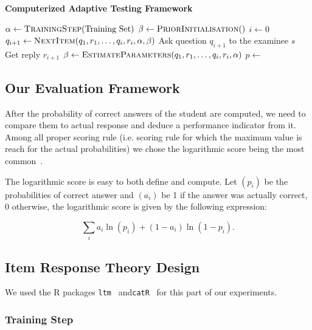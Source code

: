 \documentclass{sig-alternate}
\begin{document}
\begin{algorithm}
\caption*{\textbf{Computerized Adaptive Testing Framework}}
\begin{algorithmic}
\State $\alpha \gets \Call{TrainingStep}{\text{Training Set}}$
\State $\beta \gets \Call{PriorInitialisation}$
\State $i \gets 0$
		\State $q_{i + 1} \gets \Call{NextItem}{q_1, r_1, \ldots, q_i, r_i, \alpha, \beta}$
		\State Ask question $q_{i + 1}$ to the examinee $s$
		\State Get reply $r_{i + 1}$
		\State $\beta \gets \Call{EstimateParameters}{q_1, r_1, \ldots, q_i, r_i, \alpha}$
	\EndWhile
	\State $p \gets$ 
	\State {}
\EndFor
\EndProcedure
\end{algorithmic}
\end{algorithm}

\subsection{Our Evaluation Framework}

After the probability of correct answers of the student are computed, we need to compare them to actual response and deduce a performance indicator from it. Among all proper scoring rule (i.e. scoring rule for which the maximum value is reach for the actual probabilities) we chose the logarithmic score being the most common~\citep{Gneiting2007}.

The logarithmic score is easy to both define and compute. Let $(p_i)$ be the probabilities of correct answer and $(a_i)$ be 1 if the answer was actually correct, 0 otherwise, the logarithmic score is given by the following expression: 

\[ \sum_i a_i\ln(p_i) + (1-a_i)\ln(1-p_i).\]

\subsection{Item Response Theory Design}

We used the R packages \texttt{ltm}~\citep{Rizopoulos2006} and\linebreak \texttt{catR}~\citep{MagisRaiche2012} for this part of our experiments.

\subsubsection{Training Step}
\end{document}
